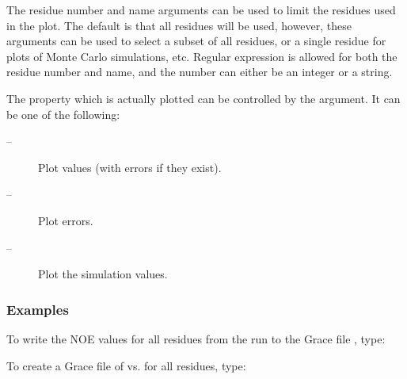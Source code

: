  The residue number and name arguments can be used to limit the residues used in the plot. The default is that all residues will be used, however, these arguments can be used to select a subset of all residues, or a single residue for plots of Monte Carlo simulations, etc.  Regular expression is allowed for both the residue number and name, and the number can either be an integer or a string. 
  

 The property which is actually plotted can be controlled by the  argument.  It can be one of the following: 
  

 \begin{description} 
 \item[ --]  Plot values (with errors if they exist).  
 \item[ --]  Plot errors.  
 \item[ --]   Plot the simulation values.  
 \end{description} 
  

  
 \subsubsection{Examples} 

 To write the NOE values for all residues from the run  to the Grace file , type: 
  





 To create a Grace file of  vs.  for all residues, type: 
  



